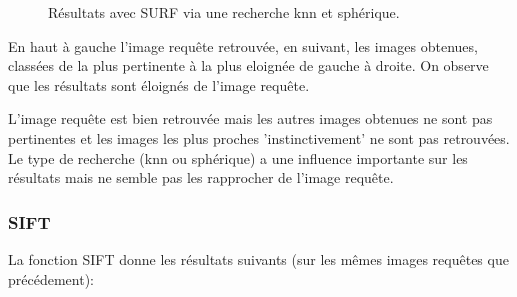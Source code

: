 \documentclass{article}
\begin{document}
\begin{figure}[!ht]%
  \centering
  \hspace{0.04\textwidth}
  \caption{Résultats avec SURF via une recherche knn et sphérique.}
  \label{desc}
\end{figure}

En haut à gauche l'image requête retrouvée, en suivant, les images obtenues, classées de la plus pertinente à la plus eloignée de gauche à droite.
On observe que les résultats sont éloignés de l'image requête. 

L'image requête est bien retrouvée mais les autres images obtenues ne sont pas pertinentes et les images les plus proches 'instinctivement' ne sont pas retrouvées. Le type de recherche (knn ou sphérique) a une influence importante sur les résultats mais ne semble pas les rapprocher de l'image requête. 

\subsubsection{SIFT}

La fonction SIFT donne les résultats suivants (sur les mêmes images requêtes que précédement):
\end{document}
